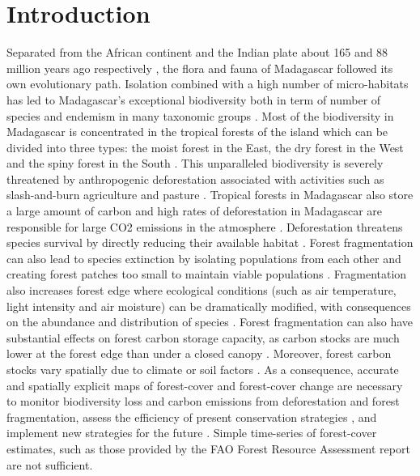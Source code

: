 \documentclass[a4paper, 12pt, leqno]{article} %
\begin{document}
\newpage

\section{Introduction}
\label{introduction}

Separated from the African continent and the Indian plate about 165
and 88 million years ago respectively \citep{Ali2008}, the flora and
fauna of Madagascar followed its own evolutionary path. Isolation
combined with a high number of micro-habitats \citep{Pearson2009} has
led to Madagascar's exceptional biodiversity both in term of number of
species and endemism in many taxonomic groups \citep{Crottini2012,
  Goodman2005}.  Most of the biodiversity in Madagascar is
concentrated in the tropical forests of the island which can be
divided into three types: the moist forest in the East, the dry forest
in the West and the spiny forest in the South
\citep{Vieilledent2016}. This unparalleled biodiversity is severely
threatened by anthropogenic deforestation \citep{Harper2007,
  Vieilledent2013} associated with activities such as slash-and-burn
agriculture and pasture \citep{Scales2011}. Tropical forests in
Madagascar also store a large amount of carbon \citep{Vieilledent2016}
and high rates of deforestation in Madagascar are responsible for
large CO2 emissions in the atmosphere
\citep{Achard2014}. Deforestation threatens species survival by
directly reducing their available habitat \citep{Brooks2002,
  Tidd2001}. Forest fragmentation can also lead to species extinction
by isolating populations from each other and creating forest patches
too small to maintain viable populations
\citep{Saunders1991}. Fragmentation also increases forest edge where
ecological conditions (such as air temperature, light intensity and
air moisture) can be dramatically modified, with consequences on the
abundance and distribution of species \citep{Murcia1995}. Forest
fragmentation can also have substantial effects on forest carbon
storage capacity, as carbon stocks are much lower at the forest edge
than under a closed canopy \citep{Brinck2017}.  Moreover, forest
carbon stocks vary spatially due to climate or soil factors
\citep{Saatchi2011, Vieilledent2016}. As a consequence, accurate and
spatially explicit maps of forest-cover and forest-cover change are
necessary to monitor biodiversity loss and carbon emissions from
deforestation and forest fragmentation, assess the efficiency of
present conservation strategies \citep{Eklund2016}, and implement new
strategies for the future \citep{Vieilledent2013,
  Vieilledent2016}. Simple time-series of forest-cover estimates, such
as those provided by the FAO Forest Resource Assessment report
\citep{Keenan2015} are not sufficient.
\end{document}
